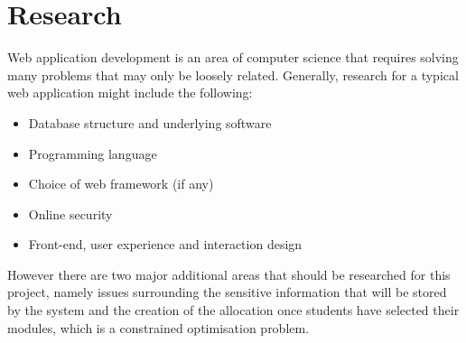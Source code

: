 
\section{Research}
\label{sec:research}


Web application development is an area of computer science that requires
solving many problems that may only be loosely related. Generally, research
for a typical web application might include the following:

\begin{itemize}
  \item Database structure and underlying software
  \item Programming language
  \item Choice of web framework (if any)
  \item Online security
  \item Front-end, user experience and interaction design
\end{itemize}

However there are two major additional areas that should be researched for
this project, namely issues surrounding the sensitive information that will be
stored by the system and the creation of the allocation once students have
selected their modules, which is a constrained optimisation problem.

